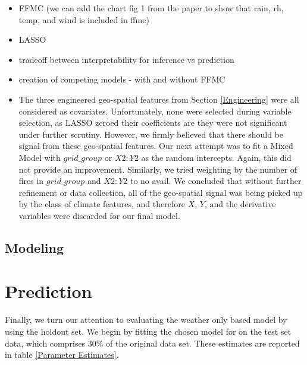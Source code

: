 \documentclass{article}
\begin{document}
\begin{itemize}

\item FFMC
(we can add the chart fig 1 from the paper to show that rain, rh, temp, and wind is included in ffmc)
\item LASSO
\item tradeoff between interpretability for inference vs prediction
\item creation of competing models - with and without FFMC
\item The three engineered geo-spatial features from Section \ref{Engineering} were all considered as covariates. Unfortunately, none were selected during variable selection, as LASSO zeroed their coefficients are they were not significant under further scrutiny. However, we firmly believed that there should be signal from these geo-spatial features. Our next attempt was to fit a Mixed Model with $\textit{grid\_group}$ or $X2:Y2$ as the random intercepts. Again, this did not provide an improvement. Similarly, we tried weighting by the number of fires in $\textit{grid\_group}$ and $X2:Y2$ to no avail. We concluded that without further refinement or data collection, all of the geo-spatial signal was being picked up by the class of climate features, and therefore $X$, $Y$, and the derivative variables were discarded for our final model.

\end{itemize}

\subsection{Modeling}

\section{Prediction}\label{Prediction}


Finally, we turn our attention to  evaluating the weather only based model by using the holdout set.  We begin by fitting the chosen model for on the test set data, which comprises 30\% of the original data set. These estimates are reported in table \ref{Parameter Estimates}.  
\end{document}
